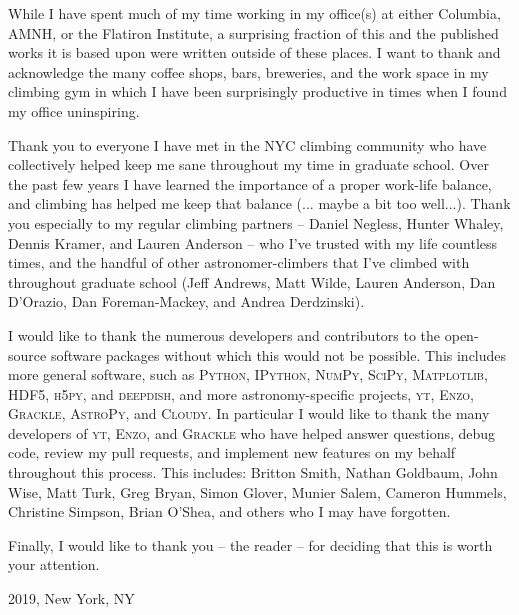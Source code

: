 While I have spent much of my time working in my office(s) at either Columbia,
AMNH, or the Flatiron Institute, a surprising fraction of this \dissertation
and the published works it is based upon were written outside of these
places. I want to thank and acknowledge the many coffee shops, bars, breweries,
and the work space in my climbing gym in which I have been
surprisingly productive in times when I found my office uninspiring.

Thank you to everyone I have met in the NYC climbing community who have collectively
helped keep me sane throughout my time in graduate school. Over the past few years
I have learned the importance of a proper work-life balance, and climbing has helped
me keep that balance (... maybe a bit too well...). Thank you especially to my
regular climbing partners -- Daniel Negless, Hunter Whaley, Dennis Kramer, and Lauren Anderson -- who I've trusted
with my life countless times, and the handful of other astronomer-climbers that I've
climbed with throughout graduate school (Jeff Andrews, Matt Wilde, Lauren Anderson, Dan D'Orazio,
Dan Foreman-Mackey, and Andrea Derdzinski).

I would like to thank the numerous developers and contributors to the
open-source software packages without which this \dissertation would not be
possible. This includes more general software, such as \textsc{Python}, \textsc{IPython}, \textsc{NumPy},
\textsc{SciPy}, \textsc{Matplotlib}, \textsc{HDF5}, \textsc{h5py},
and \textsc{deepdish}, and more astronomy-specific projects,  \textsc{yt}, \textsc{Enzo},
\textsc{Grackle}, \textsc{AstroPy}, and \textsc{Cloudy}. In particular I would like
to thank the many developers of \textsc{yt}, \textsc{Enzo}, and \textsc{Grackle}
who have helped answer questions, debug code, review my pull requests, and implement
new features on my behalf throughout this process. This includes: Britton Smith, Nathan Goldbaum,
John Wise, Matt Turk, Greg Bryan, Simon Glover, Munier Salem, Cameron Hummels,
Christine Simpson, Brian O'Shea, and others who I may have forgotten.

Finally, I would like to thank you -- the reader -- for deciding that this
\dissertation is worth your attention.

\vspace{1.8cm}
2019, New York, NY

